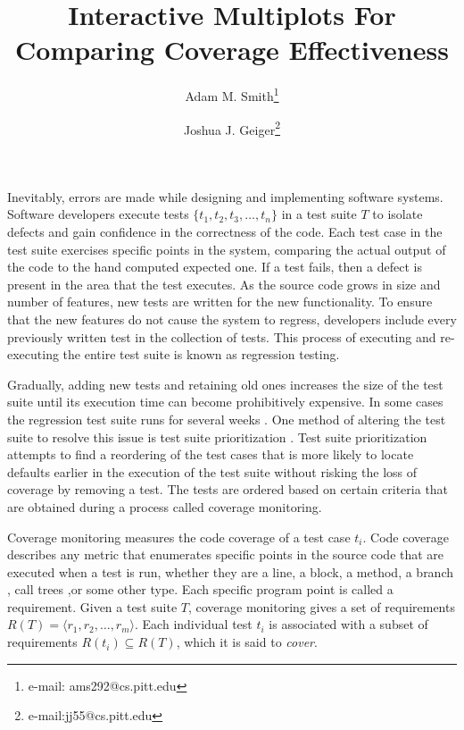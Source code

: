 \documentclass{vgtc}                          %
\title{Interactive Multiplots For Comparing Coverage Effectiveness}
\author{Adam M. Smith\thanks{e-mail: ams292@cs.pitt.edu} %
\and Joshua J. Geiger\thanks{e-mail:jj55@cs.pitt.edu}} %
\affiliation{\scriptsize University of Pittsburgh}
\begin{document}


\maketitle


Inevitably, errors are made while designing and implementing software systems. Software developers execute tests $\{t_1, t_2, t_3,\ldots, t_n\}$ in a test suite $T$ to isolate defects and gain confidence in the correctness of the code.  Each test case in the test suite exercises specific points in the system, comparing the actual output of the code to the hand computed expected one.  If a test fails, then a defect is present in the area that the test executes.  As the source code grows in size and number of features, new tests are written for the new functionality.  To ensure that the new features do not cause the system to regress, developers include every previously written test in the collection of tests.  This process of executing and re-executing the entire test suite is known as regression testing.  

Gradually, adding new tests and retaining old ones increases the size of the test suite until its execution time can become prohibitively expensive.  In some cases the regression test suite runs for several weeks \cite{empiricalfamily}.  One method of altering the test suite to resolve this issue is test suite prioritization \cite{rothermelprioritizing2001}.  Test suite prioritization attempts to find a reordering of the test cases that is more likely to locate defaults earlier in the execution of the test suite without risking the loss of coverage by removing a test.  The tests are ordered based on certain criteria that are obtained during a process called coverage monitoring.  

Coverage monitoring measures the code coverage of a test case $t_i$.  Code coverage describes any metric that enumerates specific points in the source code that are executed when a test is run, whether they are a line, a block, a method, a branch \cite{zhu}, call trees \cite{smith-calltrees} ,or some other type. Each specific program point is called a requirement.  Given a test suite $T$, coverage monitoring gives a set of requirements $R(T) = \langle r_1, r_2,\ldots,r_m \rangle$.  Each individual test $t_i$ is associated with a subset of requirements $R(t_i) \subseteq R(T)$, which it is said to \textit{cover}.  
\end{document}

